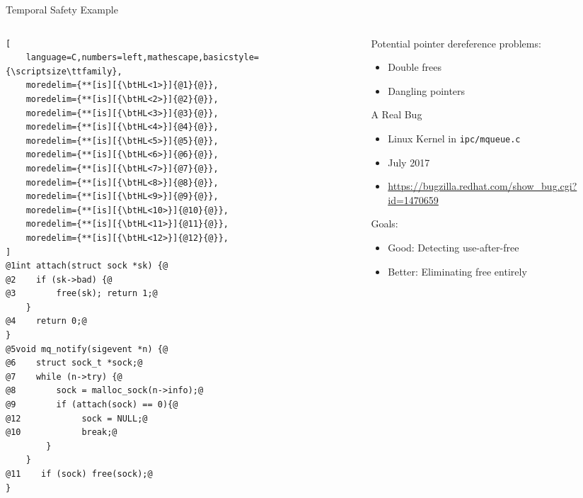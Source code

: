 \documentclass[aspectratio=169]{beamer}
\begin{document}
\begin{frame}[fragile]{Temporal Safety Example}
\begin{columns}[T]
\begin{column}{0.52\textwidth}
\begin{lstlisting}[
    language=C,numbers=left,mathescape,basicstyle={\scriptsize\ttfamily},
    moredelim={**[is][{\btHL<1>}]{@1}{@}},
    moredelim={**[is][{\btHL<2>}]{@2}{@}},
    moredelim={**[is][{\btHL<3>}]{@3}{@}},
    moredelim={**[is][{\btHL<4>}]{@4}{@}},
    moredelim={**[is][{\btHL<5>}]{@5}{@}},
    moredelim={**[is][{\btHL<6>}]{@6}{@}},
    moredelim={**[is][{\btHL<7>}]{@7}{@}},
    moredelim={**[is][{\btHL<8>}]{@8}{@}},
    moredelim={**[is][{\btHL<9>}]{@9}{@}},
    moredelim={**[is][{\btHL<10>}]{@10}{@}},
    moredelim={**[is][{\btHL<11>}]{@11}{@}},
    moredelim={**[is][{\btHL<12>}]{@12}{@}},
]
@1int attach(struct sock *sk) {@
@2    if (sk->bad) {@
@3        free(sk); return 1;@
    }
@4    return 0;@
}
@5void mq_notify(sigevent *n) {@
@6    struct sock_t *sock;@
@7    while (n->try) {@
@8        sock = malloc_sock(n->info);@
@9        if (attach(sock) == 0){@
@12            sock = NULL;@
@10            break;@
        }
    }
@11    if (sock) free(sock);@
}
\end{lstlisting}
\end{column} 
\begin{column}{0.44\textwidth}

\footnotesize{
Potential pointer dereference problems:
  \begin{itemize}
      \item Double frees
      \item Dangling pointers
  \end{itemize}
\pause

A Real Bug
 \begin{itemize}
    \item Linux Kernel in \texttt{ipc/mqueue.c}
    \item July 2017
    \item \url{https://bugzilla.redhat.com/show_bug.cgi?id=1470659}
  \end{itemize}

\pause

Goals:
\begin{itemize}
    \item Good: Detecting use-after-free
    \item Better: Eliminating free entirely 
\end{itemize}
}
\end{column}
\end{columns}

\end{frame}
\end{document}
